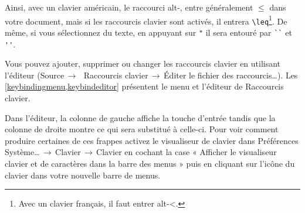 \documentclass[11pt,french]{article}
\newcommand{\TS}{\textsf{\TeX Shop}}
\newcommand{\cmd}[1]{\textsf{#1}}
\newcommand{\mnu}[1]{\textsf{#1}}
\newcommand{\To}{\,\(\to\)\,}
\begin{document}

Ainsi, avec un clavier américain, le raccourci \cmd{alt-,} entre généralement \texttt{\(\leq\)} dans votre document, mais si les raccourcis clavier sont activés, il entrera \verb|\leq|\footnote{Avec un clavier français, il faut entrer \cmd{alt-<}.}. De même, si vous sélectionnez du texte, en appuyant sur \verb|"| il sera entouré par \verb|``| et \verb|''|. 


Vous pouvez ajouter, supprimer ou changer les raccourcis clavier en utilisant l'éditeur (\mnu{Source}\To\ \mnu{Raccourcis clavier}\To\mnu{Éditer le fichier des raccourcis…}). Les \vref{keybindingmenu,keybindeditor} présentent le menu et l'éditeur de \mnu{Raccourcis clavier}. 

Dans l'éditeur, la colonne de gauche affiche la touche d'entrée tandis que la colonne de droite montre ce qui sera substitué à celle-ci. Pour voir comment produire certaines de ces frappes activez le visualiseur de clavier dans \mnu{Préférences Système…}\To\mnu{Clavier}\To\mnu{Clavier} en cochant la case « \mnu{Afficher le visualiseur clavier et de caractères dans la barre des menus} » puis en cliquant sur l'icône du clavier dans votre nouvelle barre de menus.

\end{document}
